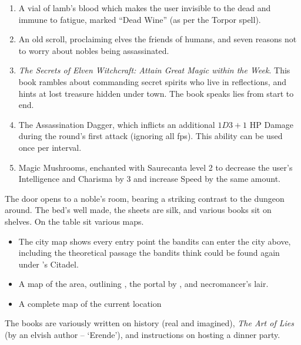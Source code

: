 \begin{enumerate}

  \item
  A vial of lamb's blood which makes the user invisible to the dead and immune to fatigue, marked ``Dead Wine'' (as per the Torpor spell).
  \item
  An old scroll, proclaiming elves the friends of humans, and seven reasons not to worry about nobles being assassinated.
  \item
  \textit{The Secrets of Elven Witchcraft: Attain Great Magic within the Week}.
  This book rambles about commanding secret spirits who live in reflections, and hints at lost treasure hidden under \gls{town}.
  The book speaks lies from start to end.
  \item
  The Assassination Dagger, which inflicts an additional $1D3+1$ HP Damage during the round's first attack (ignoring all \glspl{fp}).
  This ability can be used once per \gls{interval}.
  \item
  Magic Mushrooms, enchanted with Saurecanta level 2 to decrease the user's Intelligence and Charisma by 3 and increase Speed by the same amount.
\end{enumerate}

\begin{boxtext}
  The door opens to a noble's room, bearing a striking contrast to the dungeon around.  The bed's well made, the sheets are silk, and various books sit on shelves.
  On the table sit various maps.
\end{boxtext}

\label{sewerKingRoom}

\begin{itemize}
  \item
  The city map shows every entry point the bandits can enter the city above, including the theoretical passage the bandits think could be found again under 's Citadel.
  \item
  A map of the area, outlining , the portal by , and \gls{necromancer}'s lair.
  \item
  A complete map of the current location
\end{itemize}

The books are variously written on history (real and imagined), \textit{The Art of Lies} (by an elvish author -- `Erende'), and instructions on hosting a dinner party.



